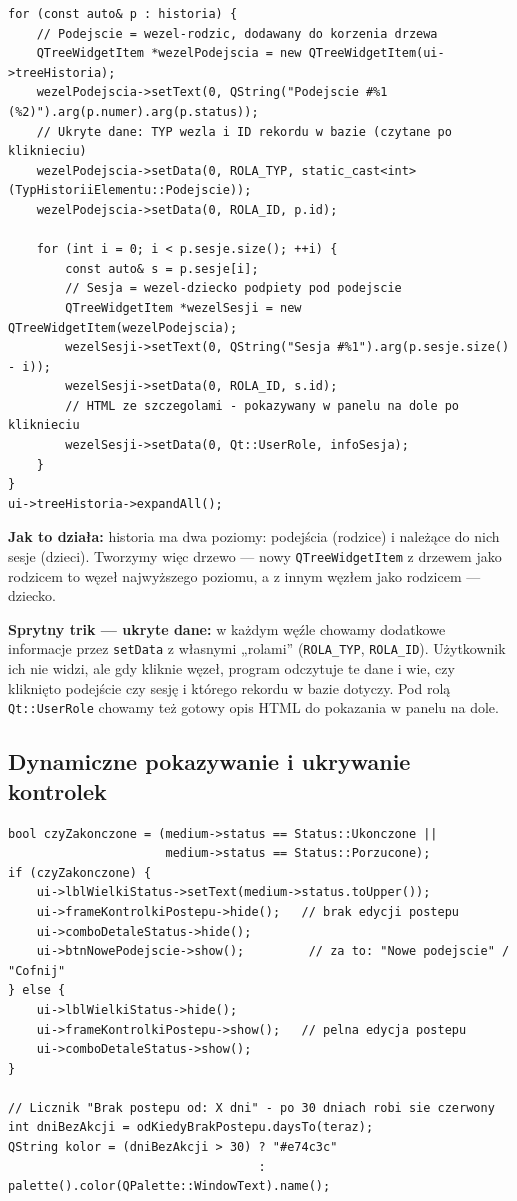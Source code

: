 \documentclass[11pt,a4paper]{article}
\begin{document}
\begin{lstlisting}[caption={Podejście jako rodzic, sesja jako dziecko}]
for (const auto& p : historia) {
    // Podejscie = wezel-rodzic, dodawany do korzenia drzewa
    QTreeWidgetItem *wezelPodejscia = new QTreeWidgetItem(ui->treeHistoria);
    wezelPodejscia->setText(0, QString("Podejscie #%1 (%2)").arg(p.numer).arg(p.status));
    // Ukryte dane: TYP wezla i ID rekordu w bazie (czytane po kliknieciu)
    wezelPodejscia->setData(0, ROLA_TYP, static_cast<int>(TypHistoriiElementu::Podejscie));
    wezelPodejscia->setData(0, ROLA_ID, p.id);

    for (int i = 0; i < p.sesje.size(); ++i) {
        const auto& s = p.sesje[i];
        // Sesja = wezel-dziecko podpiety pod podejscie
        QTreeWidgetItem *wezelSesji = new QTreeWidgetItem(wezelPodejscia);
        wezelSesji->setText(0, QString("Sesja #%1").arg(p.sesje.size() - i));
        wezelSesji->setData(0, ROLA_ID, s.id);
        // HTML ze szczegolami - pokazywany w panelu na dole po kliknieciu
        wezelSesji->setData(0, Qt::UserRole, infoSesja);
    }
}
ui->treeHistoria->expandAll();
\end{lstlisting}

\textbf{Jak to działa:} historia ma dwa poziomy: podejścia (rodzice) i należące
do nich sesje (dzieci). Tworzymy więc drzewo --- nowy \texttt{QTreeWidgetItem}
z drzewem jako rodzicem to węzeł najwyższego poziomu, a z innym węzłem jako
rodzicem --- dziecko.

\textbf{Sprytny trik --- ukryte dane:} w każdym węźle chowamy dodatkowe informacje
przez \texttt{setData} z własnymi „rolami” (\texttt{ROLA\_TYP}, \texttt{ROLA\_ID}).
Użytkownik ich nie widzi, ale gdy kliknie węzeł, program odczytuje te dane i wie,
czy kliknięto podejście czy sesję i którego rekordu w bazie dotyczy. Pod rolą
\texttt{Qt::UserRole} chowamy też gotowy opis HTML do pokazania w panelu na dole.

\subsection{Dynamiczne pokazywanie i ukrywanie kontrolek}

\begin{lstlisting}[caption={Inny układ dla pozycji zakończonej i aktywnej}]
bool czyZakonczone = (medium->status == Status::Ukonczone ||
                      medium->status == Status::Porzucone);
if (czyZakonczone) {
    ui->lblWielkiStatus->setText(medium->status.toUpper());
    ui->frameKontrolkiPostepu->hide();   // brak edycji postepu
    ui->comboDetaleStatus->hide();
    ui->btnNowePodejscie->show();         // za to: "Nowe podejscie" / "Cofnij"
} else {
    ui->lblWielkiStatus->hide();
    ui->frameKontrolkiPostepu->show();   // pelna edycja postepu
    ui->comboDetaleStatus->show();
}

// Licznik "Brak postepu od: X dni" - po 30 dniach robi sie czerwony
int dniBezAkcji = odKiedyBrakPostepu.daysTo(teraz);
QString kolor = (dniBezAkcji > 30) ? "#e74c3c"
                                   : palette().color(QPalette::WindowText).name();
\end{lstlisting}
\end{document}
